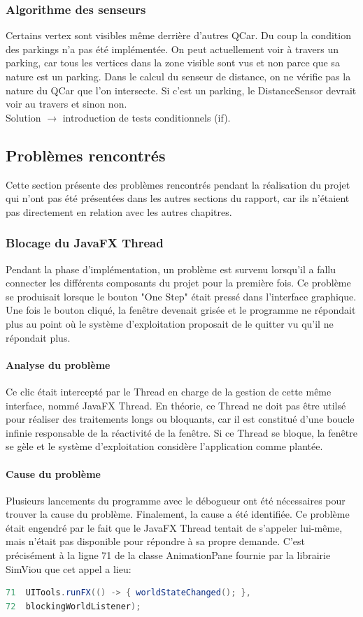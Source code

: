 \documentclass[a4paper, 12pt]{article}
\begin{document}
\subsubsection{Algorithme des senseurs}  
Certains vertex sont visibles même derrière d'autres QCar. Du coup la condition des parkings n'a pas été implémentée. On peut   actuellement voir à travers un parking, car tous les vertices dans la zone visible sont vus et non parce que sa nature est un parking.
Dans le calcul du senseur de distance, on ne vérifie pas la nature du  QCar que l'on intersecte. Si c'est un parking, le DistanceSensor devrait voir au travers et sinon non.\\
Solution $\rightarrow$ introduction de tests conditionnels (if).
\subsection{Problèmes rencontrés}
Cette section présente des problèmes rencontrés pendant la réalisation du projet qui n'ont pas été présentées dans les autres sections du rapport, car ils n'étaient pas directement en relation avec les autres chapitres.
\subsubsection{Blocage du JavaFX Thread}
Pendant la phase d'implémentation, un problème est survenu lorsqu'il a fallu connecter les différents composants du projet pour la première fois. Ce problème se produisait lorsque le bouton "One Step" était pressé dans l'interface graphique. Une fois le bouton cliqué, la fenêtre devenait grisée et le programme ne répondait plus au point où le système d'exploitation proposait de le quitter vu qu'il ne répondait plus.
\paragraph{Analyse du problème}
Ce clic était intercepté par le Thread en charge de la gestion de cette même interface, nommé JavaFX Thread. En théorie, ce Thread ne doit pas être utilsé pour réaliser des traitements longs ou bloquants, car il est constitué d'une boucle infinie responsable de la réactivité de la fenêtre. Si ce Thread se bloque, la fenêtre se gèle et le système d'exploitation considère l'application comme plantée. 
\paragraph{Cause du problème}
Plusieurs lancements du programme avec le débogueur ont été nécessaires pour trouver la cause du problème. Finalement, la cause a été identifiée. Ce problème était engendré par le fait que le JavaFX Thread tentait de s'appeler lui-même, mais n'était pas disponible pour répondre à sa propre demande. C'est précisément à la ligne 71 de la classe AnimationPane fournie par la librairie SimViou que cet appel a lieu:
\begin{lstlisting}[language=Java]
71  UITools.runFX(() -> { worldStateChanged(); },
72  blockingWorldListener);
\end{lstlisting}
\end{document}

